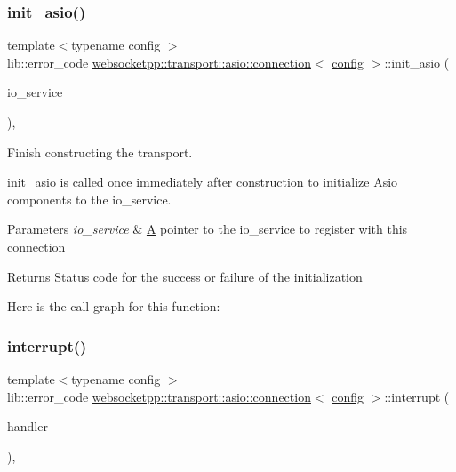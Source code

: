 \subsubsection{\texorpdfstring{init\+\_\+asio()}{init\_asio()}}
{\footnotesize\ttfamily template$<$typename config $>$ \\
lib\+::error\+\_\+code \mbox{\hyperlink{classwebsocketpp_1_1transport_1_1asio_1_1connection}{websocketpp\+::transport\+::asio\+::connection}}$<$ \mbox{\hyperlink{classconfig}{config}} $>$\+::init\+\_\+asio (\begin{DoxyParamCaption}\item[{\mbox{\hyperlink{classwebsocketpp_1_1transport_1_1asio_1_1connection_a8a0bff59326cab2996e414d32f627232}{io\+\_\+service\+\_\+ptr}}}]{io\+\_\+service }\end{DoxyParamCaption})\hspace{0.3cm}{\ttfamily [inline]}, {\ttfamily [protected]}}



Finish constructing the transport. 

init\+\_\+asio is called once immediately after construction to initialize Asio components to the io\+\_\+service.


\begin{DoxyParams}{Parameters}
{\em io\+\_\+service} & \mbox{\hyperlink{struct_a}{A}} pointer to the io\+\_\+service to register with this connection\\
\hline
\end{DoxyParams}
\begin{DoxyReturn}{Returns}
Status code for the success or failure of the initialization 
\end{DoxyReturn}
Here is the call graph for this function\+:
\mbox{\label{classwebsocketpp_1_1transport_1_1asio_1_1connection_a2fc9b41450047e40a3b5476c0e3bf853}} 
\subsubsection{\texorpdfstring{interrupt()}{interrupt()}}
{\footnotesize\ttfamily template$<$typename config $>$ \\
lib\+::error\+\_\+code \mbox{\hyperlink{classwebsocketpp_1_1transport_1_1asio_1_1connection}{websocketpp\+::transport\+::asio\+::connection}}$<$ \mbox{\hyperlink{classconfig}{config}} $>$\+::interrupt (\begin{DoxyParamCaption}\item[{\mbox{\hyperlink{namespacewebsocketpp_1_1transport_a8090563b066d7e8e31f7165be18dee51}{interrupt\+\_\+handler}}}]{handler }\end{DoxyParamCaption})\hspace{0.3cm}{\ttfamily [inline]}, {\ttfamily [protected]}}



